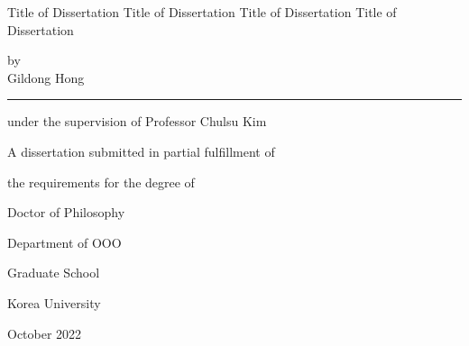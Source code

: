 \documentclass[11pt]{report}
\begin{document}
\newpage %
\begin{center}
\huge Title of Dissertation Title of Dissertation Title of Dissertation Title of Dissertation  
\par\vspace{1.5cm} %
\Large by\\
Gildong Hong %
\par\vspace{1.0cm}
\rule{.6\textwidth}{0.4pt} %
\par\vspace{0.7cm}
under the supervision of Professor Chulsu Kim
\par\vspace{0.7cm}
A dissertation submitted in partial fulfillment of \par
the requirements for the degree of \par
Doctor of Philosophy  
\par\vspace{10pt}
\Large Department of OOO %
\par\vspace{1.5cm}
\LARGE Graduate School 
\par\vspace{0.2cm}
\LARGE Korea University 
\par\vspace{1cm}
\large October 2022 %
\end{center}


\end{document}
